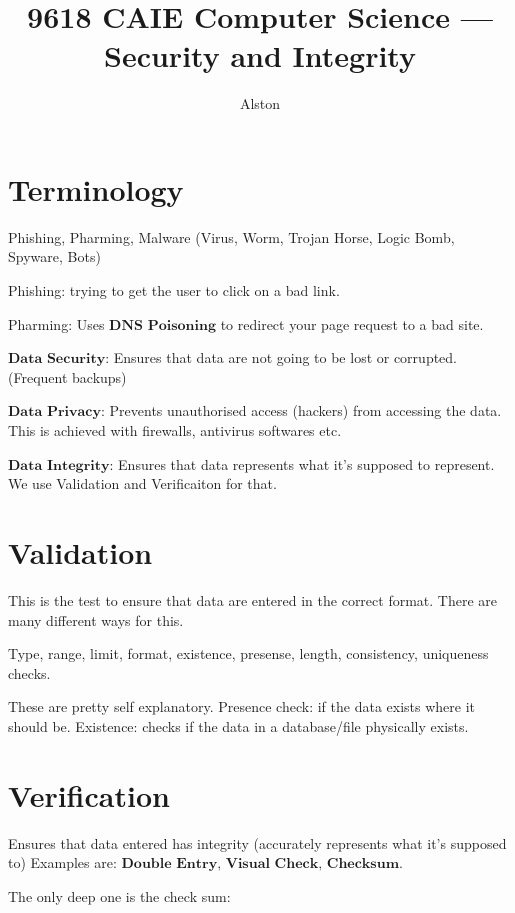 \documentclass{article}
\title{9618 CAIE Computer Science — Security and Integrity}
\author{Alston}
\date{}
\theoremstyle{mytheoremstyle}
\theoremstyle{mytheoremstyle}
\theoremstyle{myproblemstyle}
\begin{document}
    \maketitle

    \section{Terminology}
    Phishing, Pharming, Malware (Virus, Worm, Trojan Horse, Logic Bomb, Spyware, Bots)

    \vspace{5pt}

    Phishing: trying to get the user to click on a bad link.
    
    Pharming: Uses $\textbf{DNS Poisoning}$ to redirect your page request to a bad site. 

    \vspace{5pt}

    $\textbf{Data Security:}$ Ensures that data are not going to be lost or corrupted. (Frequent backups)
    
    $\textbf{Data Privacy:}$ Prevents unauthorised access (hackers) from accessing the data. This is achieved with firewalls, antivirus softwares etc.
    
    $\textbf{Data Integrity:}$ Ensures that data represents what it's supposed to represent. We use Validation and Verificaiton for that.

    \section{Validation}
    This is the test to ensure that data are entered in the correct format. There are many different ways for this.

    Type, range, limit, format, existence, presense, length, consistency, uniqueness checks.

    These are pretty self explanatory. Presence check: if the data exists where it should be. Existence: checks if the data in a database/file physically exists. 

    \section{Verification}
    Ensures that data entered has integrity (accurately represents what it's supposed to)
    Examples are: $\textbf{Double Entry, Visual Check, Checksum}$. 

    The only deep one is the check sum:
\end{document}
